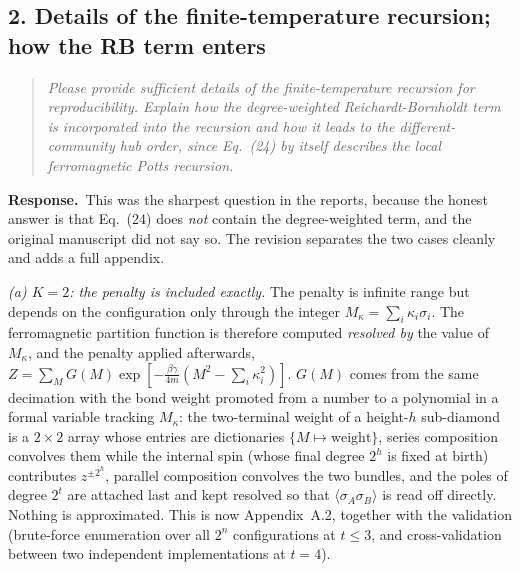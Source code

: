 \documentclass[11pt]{article}
\newenvironment{point}{\begin{quote}\itshape}{\end{quote}}
\newcommand{\reply}{\par\noindent\textbf{Response.}\ }
\begin{document}
\subsection*{2. Details of the finite-temperature recursion; how the RB term enters}

\begin{point}
Please provide sufficient details of the finite-temperature recursion for
reproducibility. Explain how the degree-weighted Reichardt-Bornholdt term is
incorporated into the recursion and how it leads to the different-community hub
order, since Eq.~(24) by itself describes the local ferromagnetic Potts
recursion.
\end{point}

\reply This was the sharpest question in the reports, because the honest answer
is that Eq.~(24) does \emph{not} contain the degree-weighted term, and the
original manuscript did not say so. The revision separates the two cases
cleanly and adds a full appendix.

\emph{(a) $K=2$: the penalty is included exactly.} The penalty is infinite
range but depends on the configuration only through the integer
$M_\kappa=\sum_i\kappa_i\sigma_i$. The ferromagnetic partition function is
therefore computed \emph{resolved by} the value of $M_\kappa$, and the penalty
applied afterwards, $Z=\sum_M G(M)\exp[-\tfrac{\beta\gamma}{4m}(M^2-\sum_i
\kappa_i^2)]$. $G(M)$ comes from the same decimation with the bond weight
promoted from a number to a polynomial in a formal variable tracking
$M_\kappa$: the two-terminal weight of a height-$h$ sub-diamond is a
$2\times2$ array whose entries are dictionaries $\{M\mapsto\text{weight}\}$,
series composition convolves them while the internal spin (whose final degree
$2^h$ is fixed at birth) contributes $z^{\pm2^h}$, parallel composition
convolves the two bundles, and the poles of degree $2^t$ are attached last and
kept resolved so that $\langle\sigma_A\sigma_B\rangle$ is read off directly.
Nothing is approximated. This is now Appendix~A.2, together with the validation
(brute-force enumeration over all $2^n$ configurations at $t\le3$, and
cross-validation between two independent implementations at $t=4$).
\end{document}

